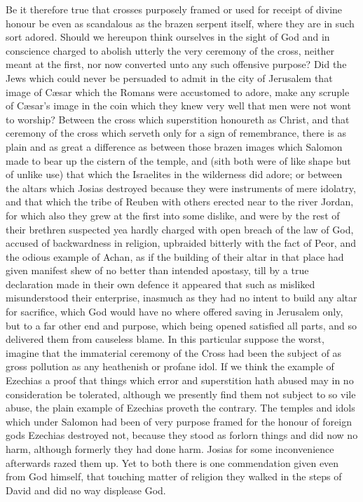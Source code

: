 Be it therefore true that crosses purposely framed or used for receipt of divine honour be even as scandalous as the brazen serpent itself, where they are in such sort adored. Should we hereupon think ourselves in the sight of God and in conscience charged to abolish utterly the very ceremony of the cross, neither meant at the first, nor now converted unto any such offensive purpose? Did the Jews which could never be persuaded to admit in the city of Jerusalem that image of Cæsar which the Romans were accustomed to adore,  make any scruple of Cæsar’s image in the coin which they knew very well that men were not wont to worship?
 Between the cross which superstition honoureth as Christ, and that ceremony of the cross which serveth only for a sign of remembrance, there is as plain and as great a difference as between those brazen images which Salomon made to bear up the cistern of the temple, and (sith both were of like shape but of unlike use) that which the Israelites in the wilderness did adore; or between the altars which Josias destroyed because they were instruments of mere idolatry, and that which the tribe of Reuben with others erected near to the river Jordan, for which also they grew at the first into some dislike, and were by the rest of their brethren suspected yea hardly charged with open breach of the law of God, accused of backwardness in religion, upbraided bitterly with the fact of Peor, and the odious example of Achan, as if the building of their altar in that place had given manifest shew of no better than intended apostasy, till by a true declaration made in their own defence it appeared that such as misliked misunderstood their enterprise, inasmuch as they had no intent to build any altar for sacrifice, which God would have no where offered saving in Jerusalem only, but to a far other end and purpose, which being opened satisfied all parts, and so delivered them from causeless blame.
In this particular suppose the worst, imagine that the immaterial ceremony of the Cross had been the subject of as gross pollution as any heathenish or profane idol. If we think the example of Ezechias a proof that things which error and superstition hath abused may in no consideration be tolerated, although we presently find them not subject to so vile abuse, the plain example of Ezechias proveth the contrary. The temples and idols which under Salomon had been of very purpose framed for the honour of foreign gods Ezechias destroyed not, because they stood as forlorn things and did now  no harm, although formerly they had done harm.
 Josias for some inconvenience afterwards razed them up. Yet to both there is one commendation given even from God himself, that touching matter of religion they walked in the steps of David and did no way displease God.
